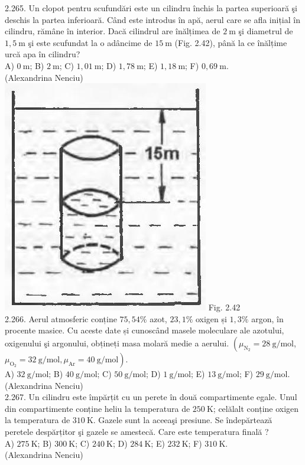 2.265. Un clopot pentru scufundări este un cilindru închis la partea superioară şi deschis la partea inferioară. Când este introdus în apă, aerul care se afla inițial în cilindru, rămâne în interior. Dacă cilindrul are înălțimea de $2 \mathrm{~m}$ şi diametrul de $1,5 \mathrm{~m}$ şi este scufundat la o adâncime de $15 \mathrm{~m}$ (Fig. 2.42), până la ce înălțime urcă apa în cilindru?\\ A) $0 \mathrm{~m}$; B) $2 \mathrm{~m}$; C) $1,01 \mathrm{~m}$; D) $1,78 \mathrm{~m}$; E) $1,18 \mathrm{~m}$; F) $0,69 \mathrm{~m}$.\\ (Alexandrina Nenciu)\\ \includegraphics[width=0.4\linewidth]{images/2025_07_01_5b3ff9fa0d508c8e9f17g-133} Fig. 2.42\\

2.266. Aerul atmosferic conține $75,54 \%$ azot, $23,1 \%$ oxigen și $1,3 \%$ argon, în procente masice. Cu aceste date și cunoscând masele moleculare ale azotului, oxigenului şi argonului, obțineți masa molară medie a aerului. $\left(\mu_{\mathrm{N}_{2}}=28 \mathrm{~g} / \mathrm{mol}\right.$, $\left.\mu_{\mathrm{O}_{2}}=32 \mathrm{~g} / \mathrm{mol}, \mu_{\mathrm{Ar}}=40 \mathrm{~g} / \mathrm{mol}\right)$.\\ A) $32 \mathrm{~g} / \mathrm{mol}$; B) $40 \mathrm{~g} / \mathrm{mol}$; C) $50 \mathrm{~g} / \mathrm{mol}$; D) $1 \mathrm{~g} / \mathrm{mol}$; E) $13 \mathrm{~g} / \mathrm{mol}$; F) $29 \mathrm{~g} / \mathrm{mol}$.\\ (Alexandrina Nenciu)\\

2.267. Un cilindru este împărțit cu un perete în două compartimente egale. Unul din compartimente conține heliu la temperatura de $250 \mathrm{~K}$; celălalt conține oxigen la temperatura de $310 \mathrm{~K}$. Gazele sunt la aceeaşi presiune. Se îndepărtează peretele despărțitor şi gazele se amestecă. Care este temperatura finală ?\\ A) $275 \mathrm{~K}$; B) $300 \mathrm{~K}$; C) $240 \mathrm{~K}$; D) $284 \mathrm{~K}$; E) $232 \mathrm{~K}$; F) $310 \mathrm{~K}$.\\ (Alexandrina Nenciu)\\


